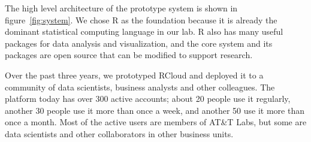 The high level architecture of the prototype system
is shown in figure~\ref{fig:system}.
We chose R as the foundation because it is already
the dominant statistical computing language in our lab.
R also has many useful packages for data analysis and visualization,
and the core system and its packages are open source that can be modified to
support research. 

Over the past three years, we prototyped RCloud and deployed it to
a community of data scientists, business analysts and other colleagues. The
platform today has over 300 active accounts; about 20 people use it regularly,
another 30 people use it more than once a week, and another 50 use it more than
once a month. Most of the
active users are members of AT\&T Labs, but some are data scientists and other
collaborators in other business units.
